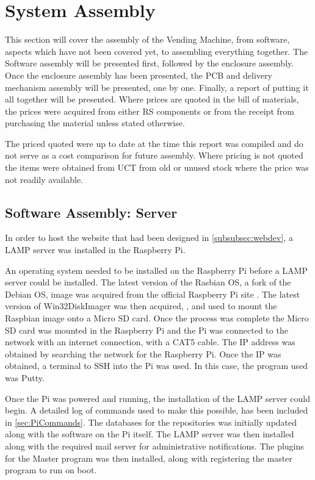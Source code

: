 \documentclass[a4paper,11pt]{article}
\numberwithin{figure}{section}
\numberwithin{table}{section}
\begin{document}
\section{System Assembly}\thispagestyle{sectionstart}
This section will cover the assembly of the Vending Machine, from software, aspects which have not been covered yet, to assembling everything together. The Software assembly will be presented first, followed by the enclosure assembly. Once the enclosure assembly has been presented, the PCB and delivery mechanism assembly will be presented, one by one. Finally, a report of putting it all together will be presented. Where prices are quoted in the bill of materials, the prices were acquired from either RS components \cite{rsonline} or from the receipt from purchasing the material unless stated otherwise.

The priced quoted were up to date at the time this report was compiled and do not serve as a cost comparison for future assembly. Where pricing is not quoted the items were obtained from UCT from old or unused stock where the price was not readily available.

\subsection{Software Assembly: Server}

In order to host the website that had been designed in \autoref{subsubsec:webdev}, a LAMP server was installed in the Raspberry Pi.

An operating system needed to be installed on the Raspberry Pi before a LAMP server could be installed. The latest version of the Rasbian OS, a fork of the Debian OS, image was acquired from the official Raspberry Pi site \cite{raspbian}. The latest version of Win32DiskImager was then acquired, \cite{diskimage}, and used to mount the Raspbian image onto a Micro SD card. Once the process was complete the Micro SD card was mounted in the Raspberry Pi and the Pi was connected to the network with an internet connection, with a CAT5 cable. The IP address was obtained by searching the network for the Raspberry Pi. Once the IP was obtained, a terminal to SSH into the Pi was used. In this case, the program used was Putty.

Once the Pi was powered and running, the installation of the LAMP server could begin. A detailed log of commands used to make this possible, has been included in \autoref{sec:PiCommands}. The databases for the repositories was initially updated along with the software on the Pi itself. The LAMP server was then installed along with the required mail server for administrative notifications. The plugins for the Master program was then installed, along with registering the master program to run on boot.
\end{document}

